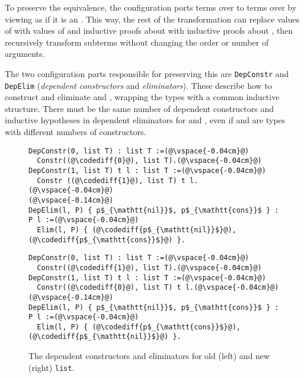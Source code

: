 To preserve the equivalence, the configuration ports terms over \A to terms over \B by viewing \B as if it is an \A.
This way, the rest of the transformation can replace values of \A with values of \B and
inductive proofs about \A with inductive proofs about \B, then recursively transform
subterms without changing the order or number of arguments.

The two configuration parts responsible for preserving this are \lstinline{DepConstr}
and \lstinline{DepElim} (\textit{dependent constructors} and \textit{eliminators}).
These describe how to construct and eliminate \A and \B, wrapping the types with a common inductive structure.
There must be the same number of dependent constructors and inductive hypotheses in dependent eliminators for \A and \B,
even if \A and \B are types with different numbers of constructors.

\begin{figure}
\begin{minipage}{0.48\textwidth}
\begin{lstlisting}
DepConstr(0, list T) : list T :=(@\vspace{-0.04cm}@)
  Constr((@\codediff{0}@), list T).(@\vspace{-0.04cm}@)
DepConstr(1, list T) t l : list T :=(@\vspace{-0.04cm}@)
  Constr ((@\codediff{1}@), list T) t l.(@\vspace{-0.04cm}@)
(@\vspace{-0.14cm}@)
DepElim(l, P) { p$_{\mathtt{nil}}$, p$_{\mathtt{cons}}$ } : P l :=(@\vspace{-0.04cm}@)
  Elim(l, P) { (@\codediff{p$_{\mathtt{nil}}$}@), (@\codediff{p$_{\mathtt{cons}}$}@) }.
\end{lstlisting}
\end{minipage}
\hfill
\begin{minipage}{0.48\textwidth}
\begin{lstlisting}
DepConstr(0, list T) : list T :=(@\vspace{-0.04cm}@)
  Constr((@\codediff{1}@), list T).(@\vspace{-0.04cm}@)
DepConstr(1, list T) t l : list T :=(@\vspace{-0.04cm}@)
  Constr((@\codediff{0}@), list T) t l.(@\vspace{-0.04cm}@)
(@\vspace{-0.14cm}@)
DepElim(l, P) { p$_{\mathtt{nil}}$, p$_{\mathtt{cons}}$ } : P l :=(@\vspace{-0.04cm}@)
  Elim(l, P) { (@\codediff{p$_{\mathtt{cons}}$}@), (@\codediff{p$_{\mathtt{nil}}$}@) }.
\end{lstlisting}
\end{minipage}
\vspace{-0.3cm}
\caption{The dependent constructors and eliminators for old (left) and new (right) \lstinline{list}.}
\label{fig:listconfig}
\end{figure}

